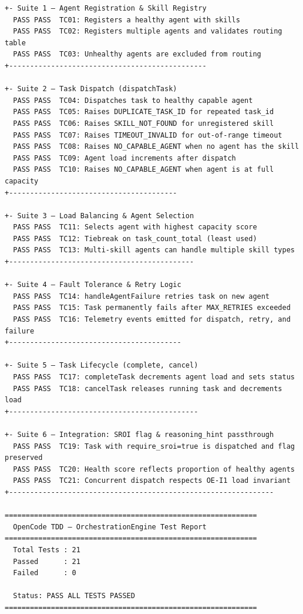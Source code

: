 \begin{lstlisting}[style=bashstyle, caption={Saída do Executor de Testes do OpenCode OrchestrationEngine}, label={lst:tdd_output}]
+- Suite 1 — Agent Registration & Skill Registry
  PASS PASS  TC01: Registers a healthy agent with skills
  PASS PASS  TC02: Registers multiple agents and validates routing table
  PASS PASS  TC03: Unhealthy agents are excluded from routing
+-----------------------------------------------

+- Suite 2 — Task Dispatch (dispatchTask)
  PASS PASS  TC04: Dispatches task to healthy capable agent
  PASS PASS  TC05: Raises DUPLICATE_TASK_ID for repeated task_id
  PASS PASS  TC06: Raises SKILL_NOT_FOUND for unregistered skill
  PASS PASS  TC07: Raises TIMEOUT_INVALID for out-of-range timeout
  PASS PASS  TC08: Raises NO_CAPABLE_AGENT when no agent has the skill
  PASS PASS  TC09: Agent load increments after dispatch
  PASS PASS  TC10: Raises NO_CAPABLE_AGENT when agent is at full capacity
+----------------------------------------

+- Suite 3 — Load Balancing & Agent Selection
  PASS PASS  TC11: Selects agent with highest capacity score
  PASS PASS  TC12: Tiebreak on task_count_total (least used)
  PASS PASS  TC13: Multi-skill agents can handle multiple skill types
+--------------------------------------------

+- Suite 4 — Fault Tolerance & Retry Logic
  PASS PASS  TC14: handleAgentFailure retries task on new agent
  PASS PASS  TC15: Task permanently fails after MAX_RETRIES exceeded
  PASS PASS  TC16: Telemetry events emitted for dispatch, retry, and failure
+-----------------------------------------

+- Suite 5 — Task Lifecycle (complete, cancel)
  PASS PASS  TC17: completeTask decrements agent load and sets status
  PASS PASS  TC18: cancelTask releases running task and decrements load
+---------------------------------------------

+- Suite 6 — Integration: SROI flag & reasoning_hint passthrough
  PASS PASS  TC19: Task with require_sroi=true is dispatched and flag preserved
  PASS PASS  TC20: Health score reflects proportion of healthy agents
  PASS PASS  TC21: Concurrent dispatch respects OE-I1 load invariant
+---------------------------------------------------------------

============================================================
  OpenCode TDD — OrchestrationEngine Test Report
============================================================
  Total Tests : 21
  Passed      : 21
  Failed      : 0

  Status: PASS ALL TESTS PASSED
============================================================
\end{lstlisting}

